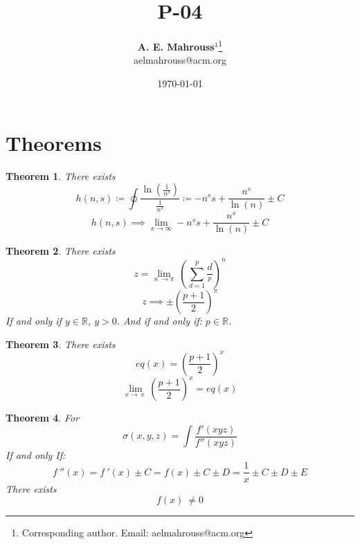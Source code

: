 \documentclass[10pt, twocolumn]{article}
\title{%
  \vspace{-1.5em}%
  \large\textbf{P-04}%
}
\author{%
  \textbf{A. E. Mahrouss}$^{1}$\thanks{Corresponding author. Email: aelmahrouss@acm.org}
  \\aelmahrouss@acm.org\\[0.4em]
}
\date{%
  \small \today
}
\theoremstyle{plain}
\newtheorem{theorem}{Theorem}[section]
\theoremstyle{definition}
\theoremstyle{remark}
\begin{document}

\twocolumn[{%
  \maketitle
  \vspace{-0.5em}
  \vspace{0.8em}
  \rule{\linewidth}{0.4pt}
  \vspace{1em}
}]


\section{Theorems}
\begin{theorem}
  There exists
  \begin{equation}
    h(n, s) \coloneqq \oint \frac{\ln(\frac{1}{n^s})}{\frac{1}{n^s}}  \coloneq -n^s s+\frac{n^s}{\ln \left(n\right)}\pm C
  \end{equation}
  \begin{equation}
    h(n, s) \implies \lim _{x\to \infty } -n^s s+\frac{n^s}{\ln \left(n\right)}\pm C
  \end{equation}
\end{theorem}

\begin{theorem}
  There exists
  \begin{equation}
    z = \lim _{n\:\to \pi }\:(\sum_{d=1}^{p} \frac{d}{^p})^{n}
  \end{equation}
  \begin{equation}
    z \implies \pm \left(\frac{p+1}{2}\right)^{\pi }
  \end{equation}
  If and only if $y \in \mathbb{R}$, $y > 0$. And if and only if: $p \in \mathbb{R}$.
\end{theorem}

\begin{theorem}
  There exists
  \begin{equation}
    eq(x) = \left(\frac{p+1}{2}\right)^{x}
  \end{equation}
  \begin{equation}
    \lim_{x \to \operatorname{e}} \left(\frac{p+1}{2}\right)^{x } = eq(x)
  \end{equation}
\end{theorem}

\begin{theorem}
  For
  \begin{equation}
    \sigma(x, y, z) = \int \frac{f'(x y z)}{f''(x y z)}
  \end{equation}
  If and only If:
  \begin{equation}
    f\:''\left(x\right)= f\:'\left(x\right)\pm C=f\left(x\right)\pm C \pm D=\frac{1}{x} \pm C \pm D \pm E
  \end{equation}
  There exists
  \begin{equation}
    f\left(x\right)\:\ne 0
  \end{equation}
\end{theorem}
\end{document}
